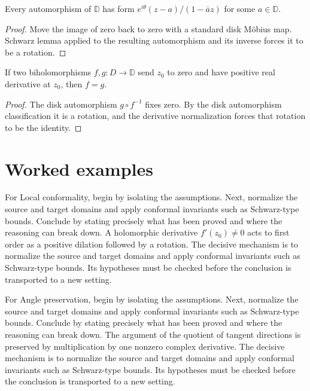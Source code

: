 \begin{theorem}\label{thm:iv17-03}
Every automorphism of $\mathbb D$ has form $e^{i\theta}(z-a)/(1-\bar a z)$ for some $a\in\mathbb D$.
\begin{proof}
Move the image of zero back to zero with a standard disk Möbius map. Schwarz lemma applied to the resulting automorphism and its inverse forces it to be a rotation.
\end{proof}
\end{theorem}

\begin{theorem}\label{thm:iv17-04}
If two biholomorphisms $f,g:D\to\mathbb D$ send $z_0$ to zero and have positive real derivative at $z_0$, then $f=g$.
\begin{proof}
The disk automorphism $g\circ f^{-1}$ fixes zero. By the disk automorphism classification it is a rotation, and the derivative normalization forces that rotation to be the identity.
\end{proof}
\end{theorem}

\section{Worked examples}

\begin{example}\label{ex:iv17-worked-01}
For Local conformality, begin by isolating the assumptions. Next, normalize the source and target domains and apply conformal invariants such as Schwarz-type bounds. Conclude by stating precisely what has been proved and where the reasoning can break down. A holomorphic derivative $f'(z_0)\ne0$ acts to first order as a positive dilation followed by a rotation. The decisive mechanism is to normalize the source and target domains and apply conformal invariants such as Schwarz-type bounds. Its hypotheses must be checked before the conclusion is transported to a new setting.
\end{example}

\begin{example}\label{ex:iv17-worked-02}
For Angle preservation, begin by isolating the assumptions. Next, normalize the source and target domains and apply conformal invariants such as Schwarz-type bounds. Conclude by stating precisely what has been proved and where the reasoning can break down. The argument of the quotient of tangent directions is preserved by multiplication by one nonzero complex derivative. The decisive mechanism is to normalize the source and target domains and apply conformal invariants such as Schwarz-type bounds. Its hypotheses must be checked before the conclusion is transported to a new setting.
\end{example}


